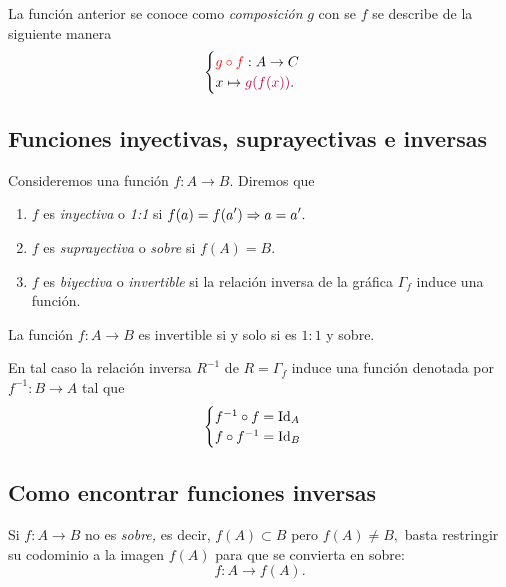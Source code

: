 La función anterior se conoce como \emph{composición} $g$ con se $f$ se describe de la siguiente manera
$$
\begin{cases} 
	{\color{red} g\circ f}:A\to C \\ 
	x \mapsto {\color{purple}g(f(x))}.
\end{cases}
$$




\subsection{Funciones inyectivas, suprayectivas e inversas}


\begin{definicion} Consideremos una función $f:A\to B.$ Diremos que
	\begin{enumerate}
		\item $f$ es \emph{inyectiva} o \emph{1:1} si $\displaystyle f(a)=f(a')\Rightarrow a=a'.$ 
		
		\item $f$ es \emph{suprayectiva} o \emph{sobre} si
		$\displaystyle f(A)=B.$ 
		
		\item $f$ es \emph{biyectiva} o \emph{invertible} si la relación inversa de la gráfica $\Gamma_{f}$ induce una función. 
	\end{enumerate}
	
\end{definicion}



\begin{proposicion}
	La función $f:A\to B$ es invertible si y solo si es $1:1$ y sobre.  
	
	En tal caso la relación inversa $R^{-1}$ de $R=\Gamma_{f}$ induce una función denotada por $\displaystyle f^{-1}:B\to A$ tal que
	$$
	\begin{cases}
		f^{-1} \circ f = \operatorname{Id}_{A}\\
		f \circ f^{-1} = \operatorname{Id}_{B}
	\end{cases}
	$$
\end{proposicion}






\subsection{Como encontrar funciones inversas}


Si $f:A \to B$ no es \emph{sobre,} es decir, $f(A) \subset B$ pero $f(A)\neq B,$ basta restringir su codominio a la imagen $f(A)$ para que se convierta en {sobre}:
$$
f: A \to f(A).
$$



